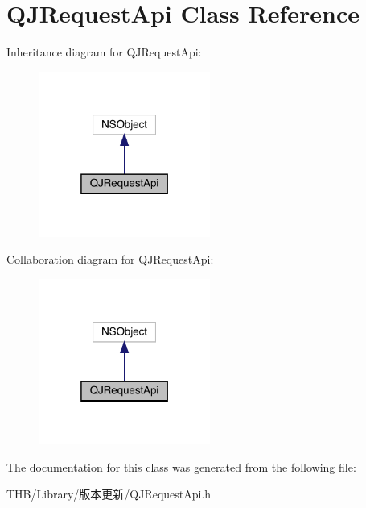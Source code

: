 \hypertarget{interface_q_j_request_api}{}\section{Q\+J\+Request\+Api Class Reference}
\label{interface_q_j_request_api}


Inheritance diagram for Q\+J\+Request\+Api\+:\nopagebreak
\begin{figure}[H]
\begin{center}
\leavevmode
\includegraphics[width=160pt]{interface_q_j_request_api__inherit__graph}
\end{center}
\end{figure}


Collaboration diagram for Q\+J\+Request\+Api\+:\nopagebreak
\begin{figure}[H]
\begin{center}
\leavevmode
\includegraphics[width=160pt]{interface_q_j_request_api__coll__graph}
\end{center}
\end{figure}


The documentation for this class was generated from the following file\+:\begin{DoxyCompactItemize}
\item 
T\+H\+B/\+Library/版本更新/Q\+J\+Request\+Api.\+h\end{DoxyCompactItemize}
